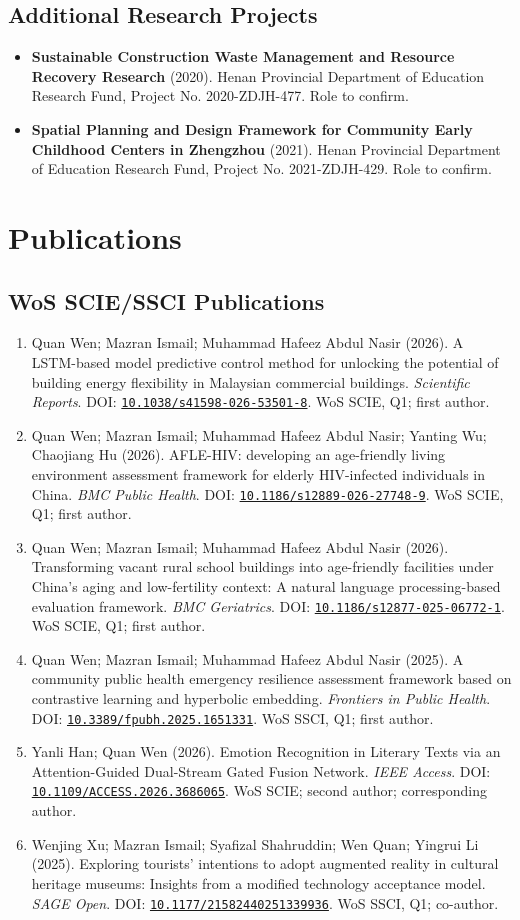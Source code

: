 \documentclass[11pt,a4paper]{article}
\newcommand{\doi}[1]{\href{https://doi.org/#1}{\nolinkurl{#1}}}
\newcommand{\pub}[6]{%
  \item #1 (#2). #3. \textit{#4}. DOI: \doi{#5}. #6%
}
\newcommand{\project}[4]{%
  \item \textbf{#1} (#2). #3. #4%
}
\begin{document}
\subsection*{Additional Research Projects}
\begin{itemize}
  \project{Sustainable Construction Waste Management and Resource Recovery Research}{2020}{Henan Provincial Department of Education Research Fund, Project No. 2020-ZDJH-477}{Role to confirm.}
  \project{Spatial Planning and Design Framework for Community Early Childhood Centers in Zhengzhou}{2021}{Henan Provincial Department of Education Research Fund, Project No. 2021-ZDJH-429}{Role to confirm.}
\end{itemize}

\section*{Publications}
\subsection*{WoS SCIE/SSCI Publications}
\begin{enumerate}
  \pub{Quan Wen; Mazran Ismail; Muhammad Hafeez Abdul Nasir}{2026}{A LSTM-based model predictive control method for unlocking the potential of building energy flexibility in Malaysian commercial buildings}{Scientific Reports}{10.1038/s41598-026-53501-8}{WoS SCIE, Q1; first author.}
  \pub{Quan Wen; Mazran Ismail; Muhammad Hafeez Abdul Nasir; Yanting Wu; Chaojiang Hu}{2026}{AFLE-HIV: developing an age-friendly living environment assessment framework for elderly HIV-infected individuals in China}{BMC Public Health}{10.1186/s12889-026-27748-9}{WoS SCIE, Q1; first author.}
  \pub{Quan Wen; Mazran Ismail; Muhammad Hafeez Abdul Nasir}{2026}{Transforming vacant rural school buildings into age-friendly facilities under China's aging and low-fertility context: A natural language processing-based evaluation framework}{BMC Geriatrics}{10.1186/s12877-025-06772-1}{WoS SCIE, Q1; first author.}
  \pub{Quan Wen; Mazran Ismail; Muhammad Hafeez Abdul Nasir}{2025}{A community public health emergency resilience assessment framework based on contrastive learning and hyperbolic embedding}{Frontiers in Public Health}{10.3389/fpubh.2025.1651331}{WoS SSCI, Q1; first author.}
  \pub{Yanli Han; Quan Wen}{2026}{Emotion Recognition in Literary Texts via an Attention-Guided Dual-Stream Gated Fusion Network}{IEEE Access}{10.1109/ACCESS.2026.3686065}{WoS SCIE; second author; corresponding author.}
  \pub{Wenjing Xu; Mazran Ismail; Syafizal Shahruddin; Wen Quan; Yingrui Li}{2025}{Exploring tourists' intentions to adopt augmented reality in cultural heritage museums: Insights from a modified technology acceptance model}{SAGE Open}{10.1177/21582440251339936}{WoS SSCI, Q1; co-author.}
\end{enumerate}
\end{document}

